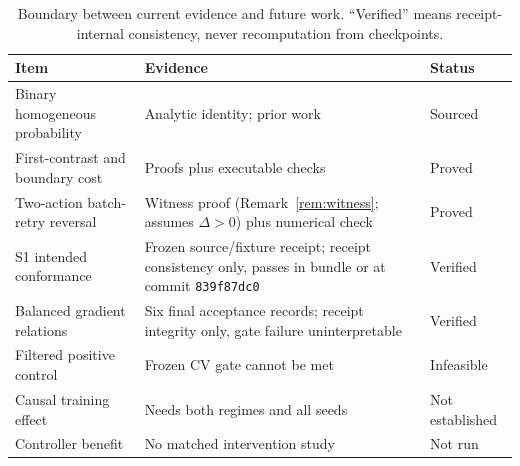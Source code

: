 \documentclass{article}
\begin{document}
\begin{table}[h]
  \centering
  \caption{Boundary between current evidence and future work.  ``Verified''
  means receipt-internal consistency, never recomputation from checkpoints.}
  \label{tab:status}
  \begin{tabularx}{\linewidth}{lXl}
    \toprule
    Item & Evidence & Status \\
    \midrule
    Binary homogeneous probability & Analytic identity; prior work & Sourced \\
    First-contrast and boundary cost & Proofs plus executable checks & Proved \\
    Two-action batch-retry reversal & Witness proof (Remark~\ref{rem:witness}; assumes $\Delta>0$) plus numerical check & Proved \\
    S1 intended conformance & Frozen source/fixture receipt; receipt consistency only, passes in bundle or at commit \texttt{839f87dc0} & Verified \\
    Balanced gradient relations & Six final acceptance records; receipt integrity only, gate failure uninterpretable & Verified \\
    Filtered positive control & Frozen CV gate cannot be met & Infeasible \\
    Causal training effect & Needs both regimes and all seeds & Not established \\
    Controller benefit & No matched intervention study & Not run \\
    \bottomrule
  \end{tabularx}
\end{table}
\end{document}
